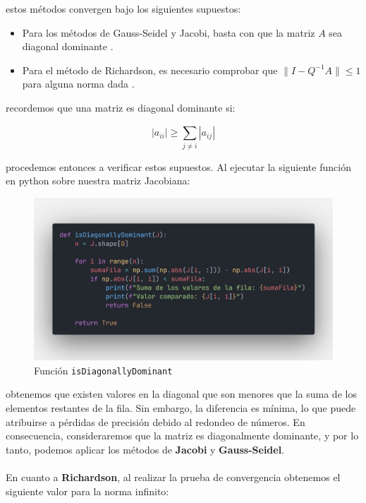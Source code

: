 \documentclass{article}
\begin{document}
  estos métodos convergen bajo los siguientes supuestos:
  \begin{itemize}
    \item Para los métodos de Gauss-Seidel y Jacobi, basta con que la matriz $A$ sea diagonal dominante \cite{kincaid2}.
    \item Para el método de Richardson, es necesario comprobar que $\|I-Q^{-1}A\| \leq 1$ para alguna norma dada \cite{kincaid2}.
  \end{itemize}

  recordemos que una matriz es diagonal dominante si:

  \[
  |a_{ii}| \geq \sum_{j \neq i}^{} |a_{ij}|
  \]

  procedemos entonces a verificar estos supuestos. Al ejecutar la siguiente función en python sobre nuestra matriz Jacobiana:

  \begin{figure}[H]
      \centering
      \includegraphics[width=1\textwidth]{DiagDom.png}
      \caption{Función \texttt{isDiagonallyDominant}}
  \end{figure}

  obtenemos que existen valores en la diagonal que son menores que la suma de los elementos restantes de la fila. Sin embargo, la diferencia es mínima, lo que puede atribuirse a pérdidas de precisión debido al redondeo de números. En consecuencia, consideraremos que la matriz es diagonalmente dominante, y por lo tanto, podemos aplicar los métodos de \textbf{Jacobi} y \textbf{Gauss-Seidel}.

  \paragraph{}
  En cuanto a \textbf{Richardson}, al realizar la prueba de convergencia obtenemos el siguiente valor para la norma infinito:
\end{document}
